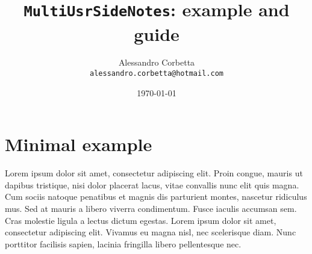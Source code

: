 \documentclass[a4paper,10pt]{article}
\title{\texttt{MultiUsrSideNotes}: example and guide}
\author{Alessandro Corbetta\\
\texttt{alessandro.corbetta@hotmail.com}}
\date{\today}
\begin{document}
\maketitle

\section{Minimal example}
Lorem ipsum dolor sit amet,  %
consectetur adipiscing elit. Proin congue, mauris ut dapibus tristique,
nisi dolor placerat lacus, vitae convallis nunc elit quis magna.
Cum sociis natoque penatibus et magnis dis parturient montes, nascetur ridiculus mus.
Sed at mauris a libero viverra condimentum.
Fusce iaculis accumsan sem. Cras %
molestie ligula a lectus dictum egestas. Lorem ipsum dolor sit amet, consectetur adipiscing elit.
Vivamus eu magna nisl, nec scelerisque diam. Nunc porttitor facilisis sapien,%
lacinia fringilla libero pellentesque nec.%
\end{document}
